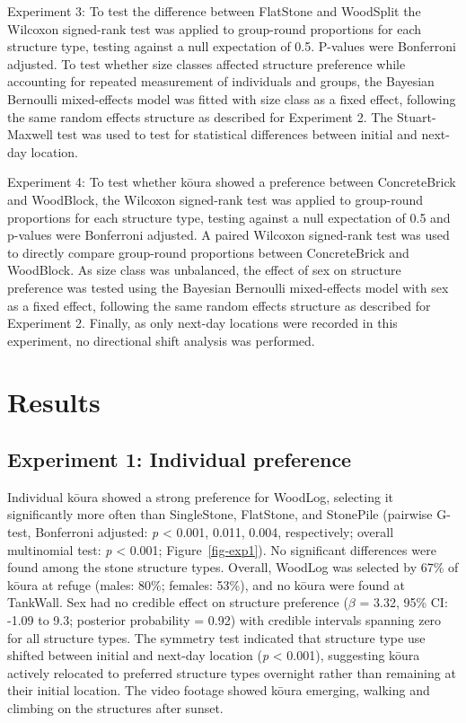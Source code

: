\documentclass[
  12pt,
  a4paper,
  oneside]{scrbook}
\begin{document}
Experiment 3: To test the difference between FlatStone and WoodSplit the
Wilcoxon signed-rank test was applied to group-round proportions for
each structure type, testing against a null expectation of 0.5. P-values
were Bonferroni adjusted. To test whether size classes affected
structure preference while accounting for repeated measurement of
individuals and groups, the Bayesian Bernoulli mixed-effects model was
fitted with size class as a fixed effect, following the same random
effects structure as described for Experiment 2. The Stuart-Maxwell test
was used to test for statistical differences between initial and
next-day location.

Experiment 4: To test whether kōura showed a preference between
ConcreteBrick and WoodBlock, the Wilcoxon signed-rank test was applied
to group-round proportions for each structure type, testing against a
null expectation of 0.5 and p-values were Bonferroni adjusted. A paired
Wilcoxon signed-rank test was used to directly compare group-round
proportions between ConcreteBrick and WoodBlock. As size class was
unbalanced, the effect of sex on structure preference was tested using
the Bayesian Bernoulli mixed-effects model with sex as a fixed effect,
following the same random effects structure as described for Experiment
2. Finally, as only next-day locations were recorded in this experiment,
no directional shift analysis was performed.

\section{Results}\label{results-2}

\subsection{Experiment 1: Individual
preference}\label{experiment-1-individual-preference-1}

Individual kōura showed a strong preference for WoodLog, selecting it
significantly more often than SingleStone, FlatStone, and StonePile
(pairwise G-test, Bonferroni adjusted: \emph{p} \textless{} 0.001,
0.011, 0.004, respectively; overall multinomial test: \emph{p}
\textless{} 0.001; Figure~\ref{fig-exp1}). No significant differences
were found among the stone structure types. Overall, WoodLog was
selected by 67\% of kōura at refuge (males: 80\%; females: 53\%), and no
kōura were found at TankWall. Sex had no credible effect on structure
preference (\(\beta\) = 3.32, 95\% CI: -1.09 to 9.3; posterior
probability = 0.92) with credible intervals spanning zero for all
structure types. The symmetry test indicated that structure type use
shifted between initial and next-day location (\emph{p} \textless{}
0.001), suggesting kōura actively relocated to preferred structure types
overnight rather than remaining at their initial location. The video
footage showed kōura emerging, walking and climbing on the structures
after sunset.
\end{document}
